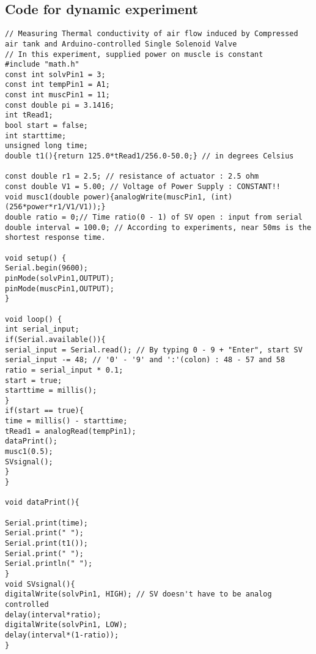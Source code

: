 \subsection{Code for dynamic experiment}\label{code_dynamic}
\begin{scriptsize}
\begin{verbatim}
// Measuring Thermal conductivity of air flow induced by Compressed air tank and Arduino-controlled Single Solenoid Valve
// In this experiment, supplied power on muscle is constant
#include "math.h"
const int solvPin1 = 3;
const int tempPin1 = A1;
const int muscPin1 = 11;
const double pi = 3.1416;
int tRead1;
bool start = false;
int starttime;
unsigned long time;
double t1(){return 125.0*tRead1/256.0-50.0;} // in degrees Celsius

const double r1 = 2.5; // resistance of actuator : 2.5 ohm
const double V1 = 5.00; // Voltage of Power Supply : CONSTANT!!
void musc1(double power){analogWrite(muscPin1, (int)(256*power*r1/V1/V1));}
double ratio = 0;// Time ratio(0 - 1) of SV open : input from serial
double interval = 100.0; // According to experiments, near 50ms is the shortest response time.

void setup() {
Serial.begin(9600);
pinMode(solvPin1,OUTPUT);
pinMode(muscPin1,OUTPUT);
}

void loop() {
int serial_input;
if(Serial.available()){ 
serial_input = Serial.read(); // By typing 0 - 9 + "Enter", start SV
serial_input -= 48; // '0' - '9' and ':'(colon) : 48 - 57 and 58
ratio = serial_input * 0.1;
start = true;
starttime = millis();
}
if(start == true){
time = millis() - starttime;
tRead1 = analogRead(tempPin1);
dataPrint();
musc1(0.5);
SVsignal();
}
}

void dataPrint(){

Serial.print(time);
Serial.print(" ");
Serial.print(t1());
Serial.print(" ");
Serial.println(" ");
}
void SVsignal(){
digitalWrite(solvPin1, HIGH); // SV doesn't have to be analog controlled
delay(interval*ratio);
digitalWrite(solvPin1, LOW);
delay(interval*(1-ratio));
}
\end{verbatim}
\end{scriptsize}
